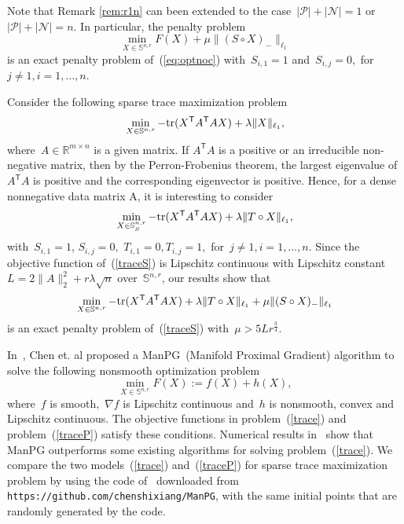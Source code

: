 \documentclass[11pt,a4paper]{article}  %
\newcommand{\url}{\texttt}
\theoremstyle{definition}
\newcommand{\RR}{\mathbb{R}}
\newcommand{\col}{r}
\newcommand{\stf}[1]{\mathbb{S}^{#1}}
\newcommand{\trs}{{\scriptstyle{\mathsf{T}}}}
\newcommand{\posset}{\mathcal{P}}
\newcommand{\negset}{\mathcal{N}}
\newcommand{\hp}{\circ}
\begin{document}
Note that Remark \ref{rem:r1n} can been extended to the case~$|\posset|+ |\negset|= 1$ or~$|\posset|+|\negset|= n$.
In particular, the penalty problem
\begin{equation}
    \nonumber
\min_{X\in  \stf{n,\col}} F(X) +\mu\|(S\hp X)_{-}\|_{\ell_1}
\end{equation}
is an exact penalty problem of~(\ref{eq:optnoc}) with~$S_{i,1}=1$ and~$S_{i,j}=0,$ for~$j\neq 1, i=1,\ldots, n$.

Consider the following  sparse trace maximization problem~\cite{SChen}
\begin{equation}\label{trace}
\min_{X\in  \stf{n,\col}} -{\rm tr}(X^\trs A^\trs A  X) +\lambda \|X\|_{\ell_1},
 \end{equation}
where~$A \in \RR^{m\times n}$ is a given matrix.
If $A^\trs A$ is a positive or an irreducible non-negative matrix, then by the Perron-Frobenius
theorem, the largest eigenvalue of~$A^\trs A$ is positive and the corresponding  eigenvector is positive. Hence, for a dense nonnegative data matrix A,  it is interesting to consider
\begin{equation}\label{traceS}
\min_{X\in  \stf{n,\col}_S} -{\rm tr}(X^\trs A^\trs A  X) +\lambda \|T\hp X\|_{\ell_1},
 \end{equation}
 with~$S_{i,1}=1$, $S_{i,j}=0,$ $T_{i,1}=0, T_{i,j}=1,$ for~$j\neq 1, i=1,\ldots, n$.  Since the objective function
 of~(\ref{traceS}) is Lipschitz continuous with Lipschitz constant~$L=2\|A\|_2^2+\col\lambda\sqrt{n}$
 over~$\stf{n,\col}$,
  our results show that
 \begin{equation}\label{traceP}
\min_{X\in  \stf{n,\col}}  -{\rm tr}(X^\trs A^\trs A  X) +\lambda \|T\hp X\|_{\ell_1} +\mu\|(S\hp X)_{-}\|_{\ell_1}
\end{equation}
is an exact penalty problem of~(\ref{traceS}) with~$\mu> 5L\col^{\frac{3}{4}}$.

In~\cite{SChen}, Chen et. al proposed a ManPG~(Manifold Proximal Gradient) algorithm to solve the
following nonsmooth
optimization problem
\begin{equation}
    \nonumber
\min_{X\in  \stf{n,\col}}F(X):= f(X) + h(X),
 \end{equation}
 where~$f$ is smooth,~$\nabla f$ is Lipschitz continuous and~$h$ is nonsmooth,  convex and Lipschitz continuous.
 The objective functions in problem~(\ref{trace}) and problem~(\ref{traceP}) satisfy these conditions.
 Numerical results in~\cite{SChen} show that ManPG outperforms some existing algorithms for  solving
 problem~(\ref{trace}). We compare the two models~(\ref{trace}) and~(\ref{traceP}) for sparse trace
 maximization problem by using the code of~\cite{SChen} downloaded from
 \url{https://github.com/chenshixiang/ManPG}, with the same initial points that are randomly generated by the code.
\end{document}
